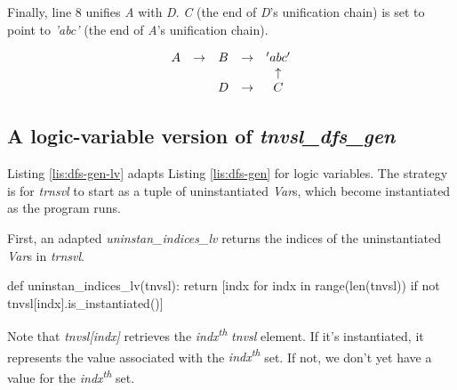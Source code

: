Finally, line 8  unifies \textit{A} with \textit{D}. \textit{C} (the end of \textit{D}'s unification chain) is set to point to \textit{'abc'} (the end of \textit{A}'s unification chain). %

\begin{equation}\label{eq:three}
\begin{array}{c c c c c c c c c c c}
A & \to & B            & \to & 'abc'      \\ 
  &     &              &     & \uparrow   \\ 
  &     & D            & \to & C        
\end{array}
\end{equation}




\smallv
\subsection{A logic-variable version of \textit{tnvsl\_dfs\_gen}}
Listing \ref{lis:dfs-gen-lv} adapts Listing \ref{lis:dfs-gen} for logic variables. The strategy is for \textit{trnsvl} to start as a tuple of uninstantiated \textit{Var}s, which become instantiated as the program runs.

First, an adapted \textit{uninstan\_indices\_lv} returns the indices of the uninstantiated \textit{Var}s in \textit{trnsvl}.
\begin{center}
\begin{minipage}[c]{0.45\textwidth}
\begin{python1}
def uninstan_indices_lv(tnvsl):
  return [indx for indx in range(len(tnvsl)) 
               if not tnvsl[indx].is_instantiated()]
\end{python1}
\end{minipage}
\end{center}

Note that \textit{tnvsl[indx]} retrieves the \textit{indx\textsuperscript{th}} \textit{tnvsl} element. If it's instantiated, it represents the value associated with the \textit{indx\textsuperscript{th}} set. If not, we don't yet have a value for the  \textit{indx\textsuperscript{th}} set.

